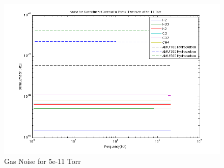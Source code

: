 \begin{figure}[htbp]
	\centering
		\includegraphics[width=15cm]{./figures/trapgasnoise_2.png}
	\caption[Gas Noise Comparison]{Gas Noise for 5e-11 Torr}
	\label{fig:gas_noise2}
\end{figure}

%
%
%
%

